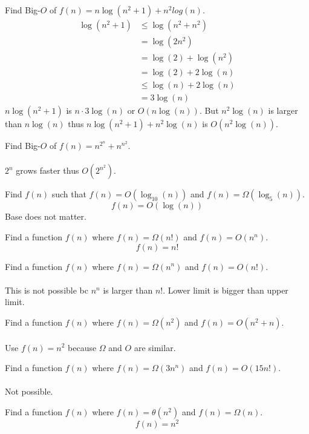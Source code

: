 \documentclass[12pt]{article}
\begin{document}
\begin{example} Find Big-$O$ of $f(n) = n\log(n^2 + 1) + n^2log(n)$. 
$$ \begin{aligned} \log(n^2 + 1) &\leq \log(n^2 + n^2)  \\ &= \log(2n^2) \\ &= \log(2) + \log(n^2) \\ &= \log(2) + 2\log(n) \\ &\leq \log(n) + 2\log(n) \\ &= 3\log(n) \end{aligned} $$  
$n\log(n^2 + 1)$ is $n\cdot 3\log(n)$ or $O(n\log(n))$. But $n^2\log(n)$ is larger than $n\log(n)$ thus $n\log(n^2 + 1) + n^2\log(n)$ is $O(n^2\log(n))$. \end{example}
\begin{example} Find Big-$O$ of $f(n) = n^{2^n} + n^{n^2} $. \\~\\
$2^n$ grows faster thus $O(2^{n^2})$. \end{example} 
\begin{example} Find $f(n)$ such that $f(n) = O(\log_{10}(n))$ and $f(n) = \Omega(\log_5(n))$.  
$$ f(n) = O(\log(n)) $$
Base does not matter. \end{example} 
\begin{example} Find a function $f(n)$ where $f(n) = \Omega(n!)$ and $f(n) = O(n^n)$.
$$f(n) = n!$$ \end{example} 
\begin{example} Find a function $f(n)$ where $f(n) = \Omega(n^n)$ and $f(n) = O(n!)$. \\~\\
This is not possible bc $n^n$ is larger than $n!$. Lower limit is bigger than upper limit. \end{example} 
\begin{example} Find a function $f(n)$ where $f(n) = \Omega(n^2)$ and $f(n) = O(n^2 + n)$.  
\\~\\Use $f(n) = n^2$ because $\Omega$ and $O$ are similar. \end{example} 
\begin{example} Find a function $f(n)$ where $f(n) = \Omega(3n^n)$ and $f(n) = O(15n!)$. \\~\\ Not possible. \end{example} 
\begin{example} Find a function $f(n)$ where $f(n) = \theta(n^2)$ and $f(n) = \Omega(n)$. $$ f(n) = n^2 $$ \end{example}
\end{document}
